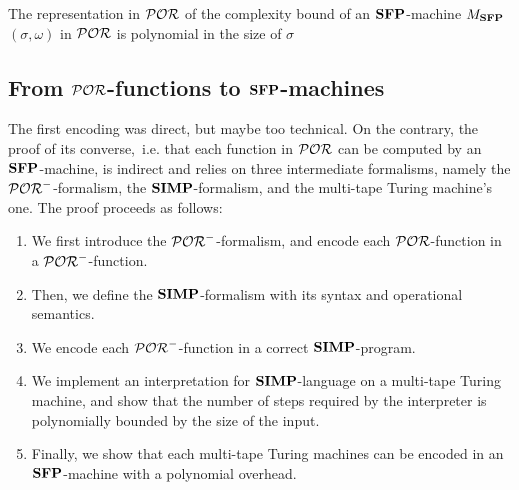 \begin{lemma}
The representation in $\mathcal{POR}$
of the complexity bound of an $\mathbf{SFP}$-machine
$M_{\mathbf{SFP}}$$(\sigma,\omega)$
in $\mathcal{POR}$ is polynomial in the size
of $\sigma$
\end{lemma}











































\subsection{From $\mathcal{POR}$-functions
to $\mathbf{SFP}$-machines}\label{sec:PORtoSFP}

The first encoding was direct, but
maybe too technical.
On the contrary, the proof of its converse,~i.e.
that each function in $\mathcal{POR}$
can be computed by an $\mathbf{SFP}$-machine,
is indirect and relies on three intermediate
formalisms, namely the $\mathcal{POR}^{-}$-formalism,
the $\mathbf{SIMP}$-formalism, and
{the multi-tape Turing machine's one}.
The proof proceeds as follows:
\begin{enumerate}
%
\item We first introduce the $\mathcal{POR}^{-}$-formalism,
and encode each $\mathcal{POR}$-function in a $\mathcal{POR}^-$-function.
%
\item Then, we define the $\mathbf{SIMP}$-formalism with its syntax and operational
semantics.
%
\item We encode each $\mathcal{POR}^-$-function in a correct $\mathbf{SIMP}$-program.
%
\item We implement an interpretation for $\mathbf{SIMP}$-language
on a multi-tape Turing machine, and show that the number of steps
required by the {interpreter} is polynomially bounded by
the size of the input.
%
\item Finally, we show that each multi-tape Turing machines can be
encoded in an $\mathbf{SFP}$-machine with a polynomial overhead.
\end{enumerate}

